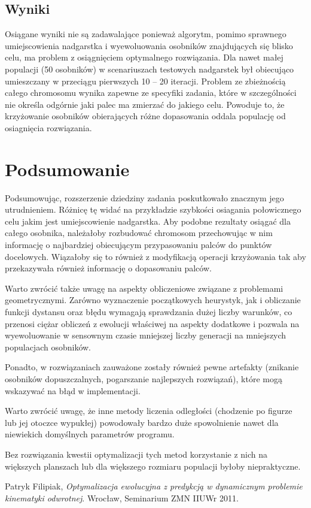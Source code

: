 \documentclass[11pt, leqno]{article}
\begin{document}
\subsection{Wyniki}
Osiągane wyniki nie są zadawalające ponieważ algorytm, pomimo sprawnego umiejscowienia nadgarstka i wyewoluowania osobników znajdujących się blisko celu, ma problem z osiągnięciem optymalnego rozwiązania. Dla nawet małej populacji (50 osobników) w scenariuszach testowych nadgarstek był obiecująco umieszczany w przeciągu pierwszych 10 -- 20 iteracji. Problem ze zbieżnością całego chromosomu wynika zapewne ze specyfiki zadania, które w szczególności nie określa odgórnie jaki palec ma zmierzać do jakiego celu. Powoduje to, że krzyżowanie osobników obierających różne dopasowania oddala populację od osiagnięcia rozwiązania.

\section{Podsumowanie}
Podsumowując, rozszerzenie dziedziny zadania poskutkowało znacznym jego utrudnieniem. Różnicę tę widać na przykładzie szybkości osiagania połowicznego celu jakim jest umiejscowienie nadgarstka. Aby podobne rezultaty osiągać dla całego osobnika, należałoby rozbudować chromosom przechowując w nim informację o najbardziej obiecującym przypasowaniu palców do punktów docelowych. Wiązałoby się to również z modyfikacją operacji krzyżowania tak aby przekazywała również informację o dopasowaniu palców.

Warto zwrócić także uwagę na aspekty obliczeniowe związane z problemami geometrycznymi. Zarówno wyznaczenie początkowych heurystyk, jak i obliczanie funkcji dystansu oraz błędu wymagają sprawdzania dużej liczby warunków, co przenosi ciężar obliczeń z ewolucji właściwej na aspekty dodatkowe i pozwala na wyewoluowanie w sensownym czasie mniejszej liczby generacji na mniejszych populacjach osobników.

Ponadto, w rozwiązaniach zauważone zostały również pewne artefakty (znikanie osobników dopuszczalnych, pogarszanie najlepszych rozwiązań), które mogą wskazywać na błąd w implementacji.

Warto zwrócić uwagę, że inne metody liczenia odległości (chodzenie po figurze lub jej otoczce wypukłej) powodowały bardzo duże spowolnienie nawet dla niewiekich domyślnych parametrów programu.  

Bez rozwiązania kwestii optymalizacji tych metod korzystanie z nich na większych planszach lub dla większego rozmiaru populacji byłoby niepraktyczne.

\begin{thebibliography}{1}
	 Patryk Filipiak, {\it Optymalizacja ewolucyjna z predykcją w dynamicznym problemie kinematyki odwrotnej}. Wrocław, Seminarium ZMN IIUWr 2011.
\end{thebibliography}
\end{document}
